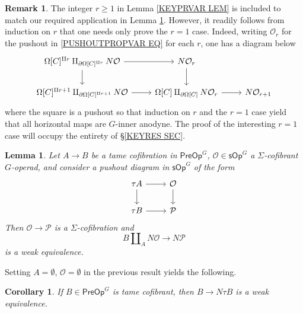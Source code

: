 \documentclass[a4paper,10pt
,draft
]{article}%
\numberwithin{equation}{section}
\numberwithin{figure}{section}
\newtheorem{lemma}[equation]{Lemma}%
\newtheorem{corollary}[equation]{Corollary}%
\theoremstyle{definition} %
\newtheorem{remark}[equation]{Remark}%
\renewcommand{\O}{\ensuremath{\mathcal O}}
\newcommand{\1}{\ensuremath{\mathbbm 1}}%
\begin{document}
\begin{remark}
	The integer $r \geq 1$ in 
	Lemma \ref{KEYPRVAR LEM}
	is included to match our required application in Lemma \ref{UNITEQUIV LEM}.
	However, it readily follows from induction on $r$ that one needs only prove the $r=1$ case.
	Indeed, writing $\O_r$ for the pushout in 
	\eqref{PUSHOUTPROPVAR EQ}
	for each $r$,
	one has a diagram below
\begin{equation}
\begin{tikzcd}
	\Omega[C]^{\amalg r} \amalg_{\partial \Omega[C]^{\amalg r}} N\mathcal{O} \ar{r} \ar{d}
&
	N \mathcal{O}_r \ar{d}
\\
	\Omega[C]^{\amalg r+1} \amalg_{ \partial \Omega[C]^{\amalg r+1}} N \mathcal{O} \ar{r}
&
	\Omega[C] \amalg_{\partial \Omega[C]} N \mathcal{O}_r \ar{r}
&
	N \mathcal{O}_{r+1}
\end{tikzcd}
\end{equation}
	where the square is a pushout so that induction on $r$ and the $r=1$ case yield that all horizontal maps
	are $G$-inner anodyne.
	The proof of the interesting $r=1$ case will occupy the entirety of \S \ref{KEYRES SEC}.
\end{remark}





\begin{lemma}\label{UNITEQUIV LEM}
	Let $A \to B$ be a tame cofibration in $\mathsf{PreOp}^G$, 
	$\mathcal{O} \in \mathsf{sOp}^G$ a $\Sigma$-cofibrant 
	$G$-operad,
	and consider a pushout diagram in $\mathsf{sOp}^G$ of the form
\begin{equation}\label{THEPUSH EQ}
\begin{tikzcd}
	\tau A \ar{r} \ar{d} & \mathcal{O} \ar{d}
\\
	\tau B \ar{r} & \mathcal{P}
\end{tikzcd}
\end{equation}
	Then $\mathcal{O} \to \mathcal{P}$ is a $\Sigma$-cofibration and 
	\begin{equation}\label{UNITEQUIV EQ}
	B \amalg_{A} N \mathcal{O}
	\to 
	N \mathcal{P}
	\end{equation}
	is a weak equivalence.
\end{lemma}

Setting $A = \emptyset $, $\mathcal{O}= \emptyset$ in the previous result yields the following.

\begin{corollary}\label{KEYEQUIV COR}
	If $B \in \mathsf{PreOp}^G$ is tame cofibrant, then 
	$B \to N \tau B$ is a weak equivalence.
\end{corollary}
\end{document}
